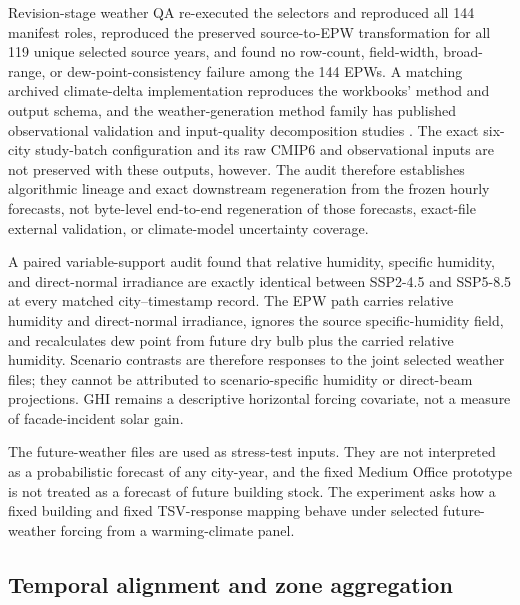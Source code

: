 Revision-stage weather QA re-executed the selectors and reproduced all 144 manifest roles, reproduced the preserved source-to-EPW transformation for all 119 unique selected source years, and found no row-count, field-width, broad-range, or dew-point-consistency failure among the 144 EPWs. A matching archived climate-delta implementation reproduces the workbooks' method and output schema, and the weather-generation method family has published observational validation and input-quality decomposition studies \citep{GuoHe2026sAMY,GuoHe2026InputQuality}. The exact six-city study-batch configuration and its raw CMIP6 and observational inputs are not preserved with these outputs, however. The audit therefore establishes algorithmic lineage and exact downstream regeneration from the frozen hourly forecasts, not byte-level end-to-end regeneration of those forecasts, exact-file external validation, or climate-model uncertainty coverage.

A paired variable-support audit found that relative humidity, specific humidity, and direct-normal irradiance are exactly identical between SSP2-4.5 and SSP5-8.5 at every matched city--timestamp record. The EPW path carries relative humidity and direct-normal irradiance, ignores the source specific-humidity field, and recalculates dew point from future dry bulb plus the carried relative humidity. Scenario contrasts are therefore responses to the joint selected weather files; they cannot be attributed to scenario-specific humidity or direct-beam projections. GHI remains a descriptive horizontal forcing covariate, not a measure of facade-incident solar gain.

The future-weather files are used as stress-test inputs. They are not interpreted as a probabilistic forecast of any city-year, and the fixed Medium Office prototype is not treated as a forecast of future building stock. The experiment asks how a fixed building and fixed TSV-response mapping behave under selected future-weather forcing from a warming-climate panel.

\subsection{Temporal alignment and zone aggregation}


